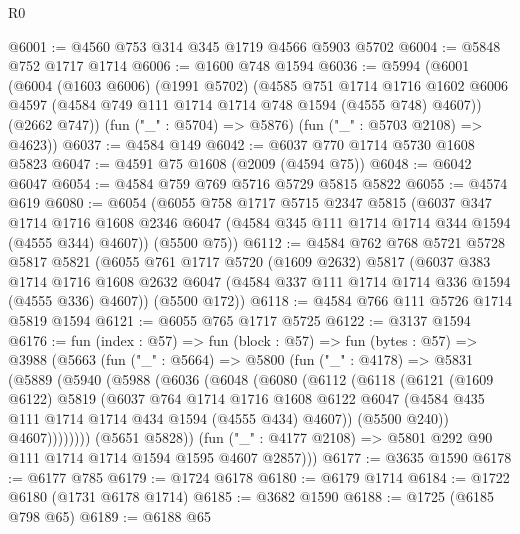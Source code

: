 \begin{lexlean}{R0}
\begin{coremodule}
@6001 := @4560 @753 @314 @345 @1719 @4566 @5903 @5702
@6004 := @5848 @752 @1717 @1714
@6006 := @1600 @748 @1594
@6036 := @5994
    (@6001
      (@6004
        (@1603 @6006)
        (@1991 @5702)
        (@4585
          @751
          @1714
          @1716
          @1602
          @6006
          @4597
          (@4584 @749 @111 @1714 @1714 @748 @1594 (@4555 @748) @4607))
        (@2662 @747))
      (fun ("_" : @5704) => @5876)
      (fun ("_" : @5703 @2108) => @4623))
@6037 := @4584 @149
@6042 := @6037 @770 @1714 @5730 @1608 @5823
@6047 := @4591 @75 @1608 (@2009 (@4594 @75))
@6048 := @6042 @6047
@6054 := @4584 @759 @769 @5716 @5729 @5815 @5822
@6055 := @4574 @619
@6080 := @6054
    (@6055
      @758
      @1717
      @5715
      @2347
      @5815
      (@6037
        @347
        @1714
        @1716
        @1608
        @2346
        @6047
        (@4584 @345 @111 @1714 @1714 @344 @1594 (@4555 @344) @4607))
      (@5500 @75))
@6112 := @4584
    @762
    @768
    @5721
    @5728
    @5817
    @5821
    (@6055
      @761
      @1717
      @5720
      (@1609 @2632)
      @5817
      (@6037
        @383
        @1714
        @1716
        @1608
        @2632
        @6047
        (@4584 @337 @111 @1714 @1714 @336 @1594 (@4555 @336) @4607))
      (@5500 @172))
@6118 := @4584 @766 @111 @5726 @1714 @5819 @1594
@6121 := @6055 @765 @1717 @5725
@6122 := @3137 @1594
@6176 := fun (index : @57) =>
  fun (block : @57) =>
  fun (bytes : @57) =>
  @3988
    (@5663
      (fun ("_" : @5664) =>
      @5800
        (fun ("_" : @4178) =>
        @5831
          (@5889
            (@5940
              (@5988
                (@6036
                  (@6048
                    (@6080
                      (@6112
                        (@6118
                          (@6121
                            (@1609 @6122)
                            @5819
                            (@6037
                              @764
                              @1714
                              @1716
                              @1608
                              @6122
                              @6047
                              (@4584 @435 @111 @1714 @1714 @434 @1594 (@4555 @434) @4607))
                            (@5500 @240))
                          @4607))))))))
          (@5651 @5828))
        (fun ("_" : @4177 @2108) => @5801 @292 @90 @111 @1714 @1714 @1594 @1595 @4607 @2857)))
@6177 := @3635 @1590
@6178 := @6177 @785
@6179 := @1724 @6178
@6180 := @6179 @1714
@6184 := @1722 @6180 (@1731 @6178 @1714)
@6185 := @3682 @1590
@6188 := @1725 (@6185 @798 @65)
@6189 := @6188 @65

\end{coremodule}
\end{lexlean}
